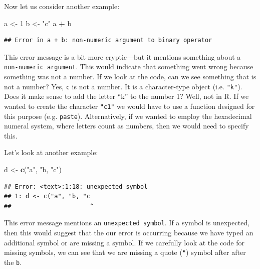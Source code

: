 \documentclass[]{book}
\newenvironment{Shaded}{\begin{snugshade}}{\end{snugshade}}
\newcommand{\KeywordTok}[1]{\textcolor[rgb]{0.13,0.29,0.53}{\textbf{#1}}}
\newcommand{\DecValTok}[1]{\textcolor[rgb]{0.00,0.00,0.81}{#1}}
\newcommand{\StringTok}[1]{\textcolor[rgb]{0.31,0.60,0.02}{#1}}
\newcommand{\OperatorTok}[1]{\textcolor[rgb]{0.81,0.36,0.00}{\textbf{#1}}}
\newcommand{\NormalTok}[1]{#1}
\begin{document}
Now let us consider another example:

\begin{Shaded}
\begin{Highlighting}[]
\NormalTok{a <-}\StringTok{ }\DecValTok{1}
\NormalTok{b <-}\StringTok{ "c"}
\NormalTok{a }\OperatorTok{+}\StringTok{ }\NormalTok{b}
\end{Highlighting}
\end{Shaded}

\begin{verbatim}
## Error in a + b: non-numeric argument to binary operator
\end{verbatim}

This error message is a bit more cryptic---but it mentions something
about a \texttt{non-numeric\ argument}. This would indicate that
something went wrong because something was not a number. If we look at
the code, can we see something that is not a number? Yes, \texttt{c} is
not a number. It is a character-type object (i.e. \texttt{"k"}). Does it
make sense to add the letter ``k'' to the number 1? Well, not in R. If
we wanted to create the character \texttt{"c1"} we would have to use a
function designed for this purpose (e.g. \texttt{paste}). Alternatively,
if we wanted to employ the hexadecimal numeral system, where letters
count as numbers, then we would need to specify this.

Let's look at another example:

\begin{Shaded}
\begin{Highlighting}[]
\NormalTok{d <-}\StringTok{ }\KeywordTok{c}\NormalTok{(}\StringTok{"a"}\NormalTok{, }\StringTok{"b, "}\NormalTok{c}\StringTok{")}
\end{Highlighting}
\end{Shaded}

\begin{verbatim}
## Error: <text>:1:18: unexpected symbol
## 1: d <- c("a", "b, "c
##                      ^
\end{verbatim}

This error message mentions an \texttt{unexpected\ symbol}. If a symbol
is unexpected, then this would suggest that the our error is occurring
because we have typed an additional symbol or are missing a symbol. If
we carefully look at the code for missing symbols, we can see that we
are missing a quote (\texttt{"}) symbol after after the \texttt{b}.


\end{document}
